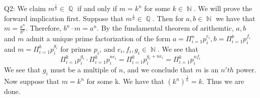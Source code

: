 \documentclass[letterpaper]{article}
\DeclareMathOperator{\N}{\mathbb{N}}
\DeclareMathOperator{\Q}{\mathbb{Q}}
\begin{document}
\noindent Q2: We claim $m^\frac{1}{n}\in \Q$ if and only if $m=k^n$ for some $k \in \N$. We will prove the forward implication first. 
Suppose that $m^\frac{1}{n}\in \Q$. Then for  $a,b\in \N$ we have that $m= \frac{a^n}{b^n}$. Therefore, $b^n\cdot m = a^n$. By the fundamental theorem of arithemtic, $a,b$ and $m$ admit a unique prime factorization of the form $a= \Pi_{i=1}^n p_i^{e_i},b=\Pi_{i=1}^k p_i^{f_i}$ and $m=\Pi_{i=1}^k p_i^{g_i}$ for primes $p_i$, and $e_i,f_i,g_i \in \N$. We see that $$\Pi_{i=1}^k p_i^{g_i} \cdot \Pi_{i=1}^k p_i^{ne_i} = \Pi_{i=1}^k p_i^{g_i+ne_i} = \Pi_{i=1}^k p_i^{nf_i}$$
We see that $g_i$ must be a multiple of $n$, and we conclude that $m$ is an $n'th$ power. 
Now suppose that $m=k^n$ for some k. We have that $({k^n})^{\frac{1}{n}} = k$. Thus we are done.
\end{document}
